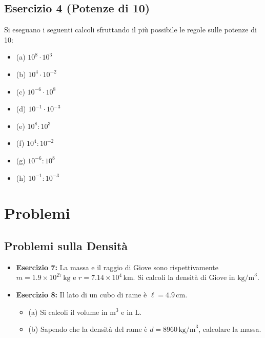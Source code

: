 \documentclass[a4paper,12pt]{article}
\begin{document}
\subsection*{Esercizio 4 (Potenze di 10)}
Si eseguano i seguenti calcoli sfruttando il più possibile le regole sulle potenze di 10:
\begin{itemize}
    \item (a) \(10^8 \cdot 10^3\)
    \item (b) \(10^4 \cdot 10^{-2}\)
    \item (c) \(10^{-6} \cdot 10^8\)
    \item (d) \(10^{-1} \cdot 10^{-3}\)
    \item (e) \(10^8 : 10^3\)
    \item (f) \(10^4 : 10^{-2}\)
    \item (g) \(10^{-6} : 10^8\)
    \item (h) \(10^{-1} : 10^{-3}\)
\end{itemize}

\section*{Problemi}

\subsection*{Problemi sulla Densità}
\begin{itemize}
    \item \textbf{Esercizio 7:} La massa e il raggio di Giove sono rispettivamente \(m = 1.9 \times 10^{27} \, \text{kg}\) e \(r = 7.14 \times 10^4 \, \text{km}\). Si calcoli la densità di Giove in \(\text{kg/m}^3\).
    \item \textbf{Esercizio 8:} Il lato di un cubo di rame è \(\ell = 4.9 \, \text{cm}\).
        \begin{itemize}
            \item (a) Si calcoli il volume in \(\text{m}^3\) e in \(\text{L}\).
            \item (b) Sapendo che la densità del rame è \(d = 8960 \, \text{kg/m}^3\), calcolare la massa.
        \end{itemize}
\end{itemize}
\end{document}
